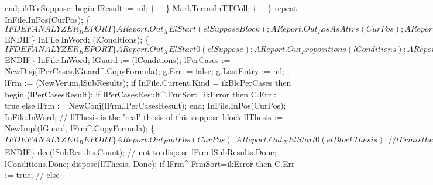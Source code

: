          end;
      ikBlcSuppose:
         begin
            lResult := nil;
            \{----\}
            MarkTermsInTTColl;
            \{----\}
            repeat InFile.InPos(CurPos);
            \{$IFDEF ANALYZER_REPORT\}
            AReport.Out_XElStart(elSupposeBlock);
            AReport.Out_PosAsAttrs(CurPos);
            AReport.Out_XAttrEnd;
            \{$ENDIF\}
            InFile.InWord;
            (lConditions);
            \{$IFDEF ANALYZER_REPORT\}
            AReport.Out_XElStart0(elSuppose);
            AReport.Out_Propositions(lConditions);
            AReport.Out_XElEnd(elSuppose);
            \{$ENDIF\}
            InFile.InWord;
            lGuard := (lConditions);
            lPerCases := NewDisj(lPerCases,lGuard^.CopyFormula);
            g.Err := false; g.LastEntry := nil;
            ;
            lFrm := (NewVerum,lSubResults);
            if InFile.Current.Kind = ikBlcPerCases then
            begin
               (lPerCasesResult);
               if lPerCasesResult^.FrmSort=ikError then C.Err := true
               else lFrm := NewConj(lFrm,lPerCasesResult);
            end;
            InFile.InPos(CurPos); InFile.InWord;
            // llThesis is the 'real' thesis of this suppose block
            llThesis := NewImpl(lGuard, lFrm^.CopyFormula);
            \{$IFDEF ANALYZER_REPORT\}
            AReport.Out_EndPos(CurPos);
            AReport.Out_XElStart0(elBlockThesis);
            // lFrm is the thesis after suppose, hence it's added
            // as the last subresult
            lSubResults.Insert(lFrm);
            for z := lSubResults.Count-1 downto 0 do
            begin
               AReport.Out_XElStart0(elThesis);
               AReport.Out_Formula(lSubResults.Items^[z]);
               AReport.Out_NatFunc(elThesisExpansions, EmptyNatFunc);
               AReport.Out_XElEnd(elThesis);
            end;
            AReport.Out_Formula(llThesis);
            // just as Thesis now, stdprep has to produce a proposition
            AReport.Out_XElEnd(elBlockThesis);
            AReport.Out_XElEnd(elSupposeBlock);
            \{$ENDIF\}
            dec(lSubResults.Count); // not to dispose lFrm
            lSubResults.Done;
            lConditions.Done;
            dispose(llThesis, Done);
            if lFrm^.FrmSort=ikError then C.Err := true;
            //     else
